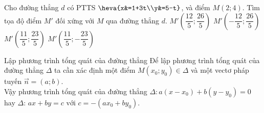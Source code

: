\begin{ex}%
	Cho đường thẳng $d$ có PTTS $\heva{x&=1+3t\\y&=5-t}$, và điểm $M(2;4)$. Tìm tọa độ điểm $M'$ đối xứng với $M$ qua đường thẳng $d$.
	\choice
	{\True $M'\left(\dfrac{12}{5};\dfrac{26}{5}\right)$}
	{$M'\left(-\dfrac{12}{5};\dfrac{26}{5}\right)$}
	{$M'\left(\dfrac{11}{5};\dfrac{23}{5}\right)$}
	{$M'\left(\dfrac{11}{5};-\dfrac{23}{5}\right)$}
\end{ex}
\begin{dang}{Lập phương trình tổng quát của đường thẳng}
	Để lập phương trình tổng quát của đường thẳng $\Delta$ ta cần xác định một điểm $M \left(x_0; y_0 \right) \in \Delta$ và một vectơ pháp tuyến $ \overrightarrow{n} = \left(a; b \right)$.\\
	Vậy phương trình tổng quát của đường thẳng $\Delta \colon a \left(x - x_0 \right) + b \left(y - y_0 \right) = 0$ hay $\Delta$: $ ax + by = c \text{ với } c = - \left(ax_0 + by_0 \right)$.
\end{dang}

